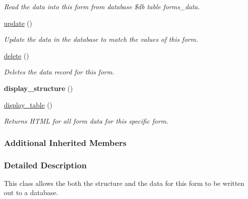 \begin{DoxyCompactItemize}
\begin{DoxyCompactList}\small\item\em Read the data into this form from database \$db table forms\-\_\-data. \end{DoxyCompactList}\item 
\hyperlink{classdatabase__form_a9c66a1a5dbd77ce0d110dd1672f74743}{update} ()
\begin{DoxyCompactList}\small\item\em Update the data in the database to match the values of this form. \end{DoxyCompactList}\item 
\hyperlink{classdatabase__form_ac65c871bc6d3a45319bbb3f20901cc56}{delete} ()
\begin{DoxyCompactList}\small\item\em Deletes the data record for this form. \end{DoxyCompactList}\item 
\hypertarget{classdatabase__form_ab973b6f65ef80102d3f49d589469de3c}{{\bfseries display\-\_\-structure} ()}\label{classdatabase__form_ab973b6f65ef80102d3f49d589469de3c}

\item 
\hyperlink{classdatabase__form_a73106bec9001ca0fe255e74a37982072}{display\-\_\-table} ()
\begin{DoxyCompactList}\small\item\em Returns H\-T\-M\-L for all form data for this specific form. \end{DoxyCompactList}\end{DoxyCompactItemize}
\subsubsection*{Additional Inherited Members}


\subsubsection{Detailed Description}
This class allows the both the structure and the data for this form to be written out to a database. 

